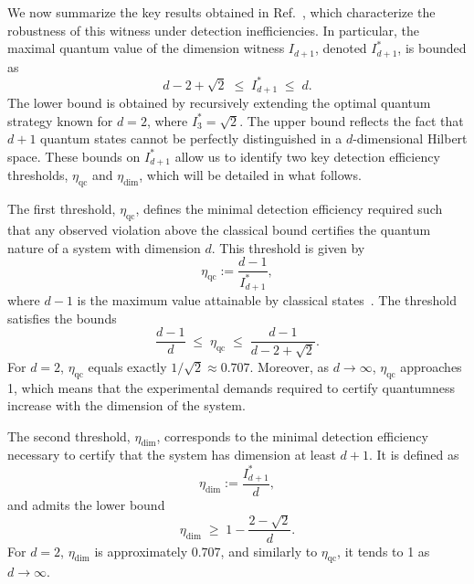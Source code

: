 \documentclass[aps,pra,reprint, superscriptaddress,showkeys]{revtex4-2}
\theoremstyle{plain}
\begin{document}
We now summarize the key results obtained in Ref.~\cite{dallarno2012}, which characterize the robustness of this witness under detection inefficiencies. In particular, the maximal quantum value of the dimension witness \(I_{d+1}\), denoted \(I^*_{d+1}\), is bounded as
\begin{equation}
    d - 2 + \sqrt{2} \;\leq\; I^*_{d+1} \;\leq\; d.
\end{equation}
The lower bound is obtained by recursively extending the optimal quantum strategy known for \(d=2\), where \(I^*_3 = \sqrt{2}\). The upper bound reflects the fact that \(d+1\) quantum states cannot be perfectly distinguished in a \(d\)-dimensional Hilbert space. These bounds on \(I^*_{d+1}\) allow us to identify two key detection efficiency thresholds, \(\eta_{\mathrm{qc}}\) and \(\eta_{\mathrm{dim}}\), which will be detailed in what follows.

The first threshold, \(\eta_{\mathrm{qc}}\), defines the minimal detection efficiency required such that any observed violation above the classical bound certifies the quantum nature of a system with dimension \(d\). This threshold is given by
\begin{equation}
    \eta_{\mathrm{qc}} := \frac{d - 1}{I^*_{d+1}},
\end{equation}
where \(d - 1\) is the maximum value attainable by classical states~\cite{gallego2010}. The threshold satisfies the bounds
\begin{equation}
    \frac{d - 1}{d} \;\leq\; \eta_{\mathrm{qc}} \;\leq\; \frac{d - 1}{d - 2 + \sqrt{2}}.
\end{equation}
For \(d=2\), \(\eta_{\mathrm{qc}}\) equals exactly \(1/\sqrt{2} \approx 0.707\). Moreover, as \(d \to \infty\), \(\eta_{\mathrm{qc}}\) approaches 1, which means that the experimental demands required to certify quantumness increase with the dimension of the system.

The second threshold, \(\eta_{\mathrm{dim}}\), corresponds to the minimal detection efficiency necessary to certify that the system has dimension at least \(d+1\). It is defined as
\begin{equation}
    \eta_{\mathrm{dim}} := \frac{I^*_{d+1}}{d},
\end{equation}
and admits the lower bound
\begin{equation}
    \eta_{\mathrm{dim}} \;\geq\; 1 - \frac{2 - \sqrt{2}}{d}.
\end{equation}
For \(d=2\), \(\eta_{\mathrm{dim}}\) is approximately \(0.707\), and similarly to \(\eta_{\mathrm{qc}}\), it tends to 1 as \(d \to \infty\).
\end{document}
